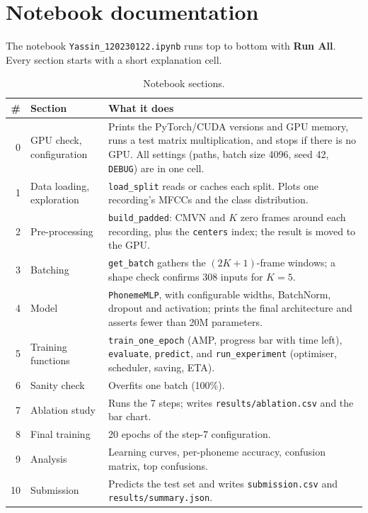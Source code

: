 \documentclass[11pt,a4paper]{article}
\begin{document}
\section{Notebook documentation}

The notebook \texttt{Yassin\_120230122.ipynb} runs top to bottom with \textbf{Run All}. Every section
starts with a short explanation cell.

\begin{table}[H]
\centering
\small
\begin{tabular}{rp{3.6cm}p{9.6cm}}
\toprule
\# & Section & What it does \\
\midrule
0  & GPU check, configuration & Prints the PyTorch/CUDA versions and GPU memory, runs a test matrix
                                multiplication, and stops if there is no GPU. All settings (paths,
                                batch size 4096, seed 42, \texttt{DEBUG}) are in one cell. \\
1  & Data loading, exploration & \texttt{load\_split} reads or caches each split. Plots one recording's
                                MFCCs and the class distribution. \\
2  & Pre-processing & \texttt{build\_padded}: CMVN and $K$ zero frames around each recording, plus the
                                \texttt{centers} index; the result is moved to the GPU. \\
3  & Batching & \texttt{get\_batch} gathers the $(2K{+}1)$-frame windows; a shape check confirms 308
                                inputs for $K=5$. \\
4  & Model & \texttt{PhonemeMLP}, with configurable widths, BatchNorm, dropout and activation; prints the final
                                architecture and asserts fewer than 20M parameters. \\
5  & Training functions & \texttt{train\_one\_epoch} (AMP, progress bar with time left),
                                \texttt{evaluate}, \texttt{predict}, and \texttt{run\_experiment} (optimiser,
                                scheduler, saving, ETA). \\
6  & Sanity check & Overfits one batch (100\%). \\
7  & Ablation study & Runs the 7 steps; writes \texttt{results/ablation.csv} and the bar chart. \\
8  & Final training & 20 epochs of the step-7 configuration. \\
9  & Analysis & Learning curves, per-phoneme accuracy, confusion matrix, top confusions. \\
10 & Submission & Predicts the test set and writes \texttt{submission.csv} and \texttt{results/summary.json}. \\
\bottomrule
\end{tabular}
\caption{Notebook sections.}
\end{table}
\end{document}
